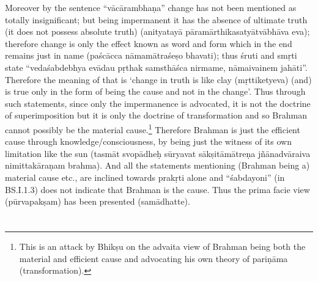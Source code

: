 Moreover by the sentence “vācārambhaṇa” change has not been mentioned as totally insignificant; but being impermanent it has the absence of ultimate truth (it does not possess absolute truth) (anityatayā pāramārthikasatyātvābhāva eva); therefore change is only the effect known as word and form which in the end remains just in name (paścācca nāmamātraśeṣo bhavati); thus śruti and smṛti state “vedaśabdebhya evādau pṛthak samsthāśca nirmame, nāmaivainem jahāti”. Therefore the meaning of that is ‘change in truth is like clay (mṛttiketyeva) (and) is true only in the form of being the cause and not in the change’. Thus through such statements, since only the impermanence is advocated, it is not the doctrine of superimposition but it is only the doctrine of transformation and so Brahman cannot possibly be the material cause.\footnote{This is an attack by Bhikṣu on the advaita view of Brahman being both the material and efficient cause and advocating his own theory of pariṇāma (transformation).} Therefore Brahman is just the efficient cause through knowledge/consciousness, by being just the witness of its own limitation like the sun (tasmāt svopādheḥ sūryavat sākṣitāmātreṇa jñānadvāraiva nimittakāraṇam brahma). And all the statements mentioning (Brahman being a) material cause etc., are inclined towards prakṛti alone and “śabdayoni” (in BS.I.1.3) does not indicate that Brahman is the cause. Thus the prima facie view (pūrvapakṣam) has been presented (samādhatte).

\section*{}





